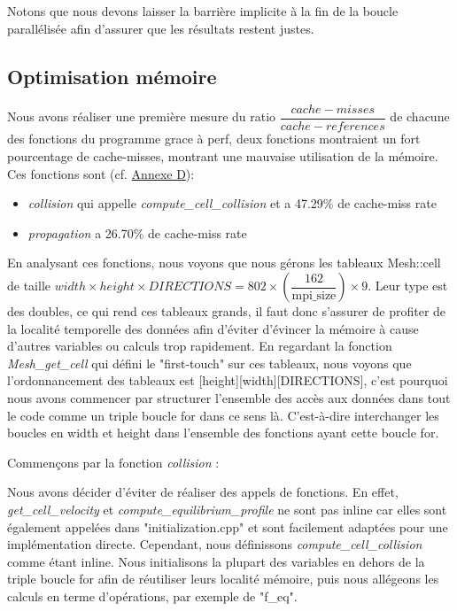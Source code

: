 Notons que nous devons laisser la barrière implicite à la fin de la boucle parallélisée afin d'assurer que les résultats restent justes.

\subsection{Optimisation mémoire}

Nous avons réaliser une première mesure du ratio $\dfrac{cache-misses}{cache-references}$ de chacune des fonctions du programme grace à perf, deux fonctions montraient un fort pourcentage de cache-misses, montrant une mauvaise utilisation de la mémoire. Ces fonctions sont (cf. \hyperref[fig:perf-naive]{Annexe D}):
\begin{itemize}
	\item[$\bullet$] \textit{collision} qui appelle \textit{compute\_cell\_collision} et a 47.29\% de cache-miss rate
	\item[$\bullet$] \textit{propagation} a 26.70\% de cache-miss rate 
\end{itemize}
En analysant ces fonctions, nous voyons que nous gérons les tableaux Mesh::cell de taille $width\times height\times DIRECTIONS = 802\times (\dfrac{162}{\text{mpi\_size}})\times 9$. Leur type est des doubles, ce qui rend ces tableaux grands, il faut donc s'assurer de profiter de la localité temporelle des données afin d'éviter d'évincer la mémoire à cause d'autres variables ou calculs trop rapidement. En regardant la fonction \textit{Mesh\_get\_cell} qui défini le "first-touch" sur ces tableaux, nous voyons que l'ordonnancement des tableaux est [height][width][DIRECTIONS], c'est pourquoi nous avons commencer par structurer l'ensemble des accès aux données dans tout le code comme un triple boucle for dans ce sens là. C'est-à-dire interchanger les boucles en width et height dans l'ensemble des fonctions ayant cette boucle for.

Commençons par la fonction \textit{collision} : 

Nous avons décider d'éviter de réaliser des appels de fonctions. En effet, \textit{get\_cell\_velocity} et \textit{compute\_equilibrium\_profile} ne sont pas inline car elles sont également appelées dans "initialization.cpp" et sont facilement adaptées pour une implémentation directe. Cependant, nous définissons \textit{compute\_cell\_collision} comme étant inline. Nous initialisons la plupart des variables en dehors de la triple boucle for afin de réutiliser leurs localité mémoire, puis nous allégeons les calculs en terme d'opérations, par exemple de "f\_eq".

